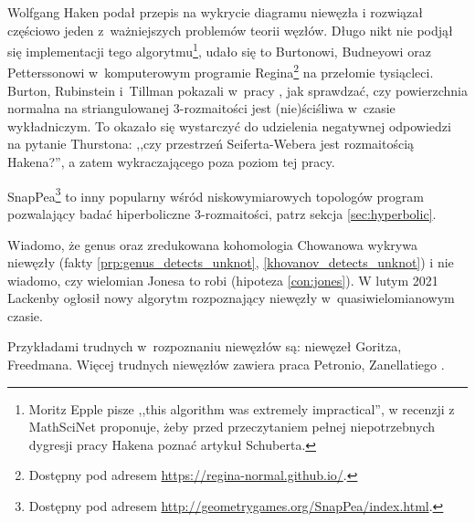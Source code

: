 Wolfgang Haken \cite{haken61} podał przepis na wykrycie diagramu niewęzła i rozwiązał częściowo jeden z~ważniejszych problemów teorii węzłów.
%
Długo nikt nie podjął się implementacji tego algorytmu\footnote{Moritz Epple pisze ,,this algorithm was extremely impractical'', w recenzji z MathSciNet proponuje, żeby przed przeczytaniem pełnej niepotrzebnych dygresji pracy Hakena poznać artykuł \cite{schubert61} Schuberta.}, udało się to Burtonowi, Budneyowi oraz Petterssonowi w~komputerowym programie Regina\footnote{Dostępny pod adresem \url{https://regina-normal.github.io/}.} na przełomie tysiącleci.
%
%
%
%
Burton, Rubinstein i~Tillman pokazali w~pracy \cite{burton12}, jak sprawdzać, czy powierzchnia normalna na striangulowanej 3-rozmaitości jest (nie)ściśliwa w~czasie wykładniczym.
%
%
To okazało się wystarczyć do udzielenia negatywnej odpowiedzi na pytanie Thurstona: ,,czy przestrzeń Seiferta-Webera jest rozmaitością Hakena?'', a zatem wykraczającego poza poziom tej pracy.
%
%
%

SnapPea\footnote{Dostępny pod adresem \url{http://geometrygames.org/SnapPea/index.html}.} to inny popularny wśród niskowymiarowych topologów program pozwalający badać hiperboliczne 3-rozmaitości, patrz sekcja \ref{sec:hyperbolic}.

Wiadomo, że genus oraz zredukowana kohomologia Chowanowa wykrywa niewęzły (fakty \ref{prp:genus_detects_unknot}, \ref{khovanov_detects_unknot}) i nie wiadomo, czy wielomian Jonesa to robi (hipoteza \ref{con:jones}).
%
%
W lutym 2021 Lackenby ogłosił nowy algorytm rozpoznający niewęzły w~quasiwielomianowym czasie.
%

Przykładami trudnych w~rozpoznaniu niewęzłów są: niewęzeł Goritza, Freedmana.
Więcej trudnych niewęzłów zawiera praca Petronio, Zanellatiego \cite{zanellati16}.
%
%

